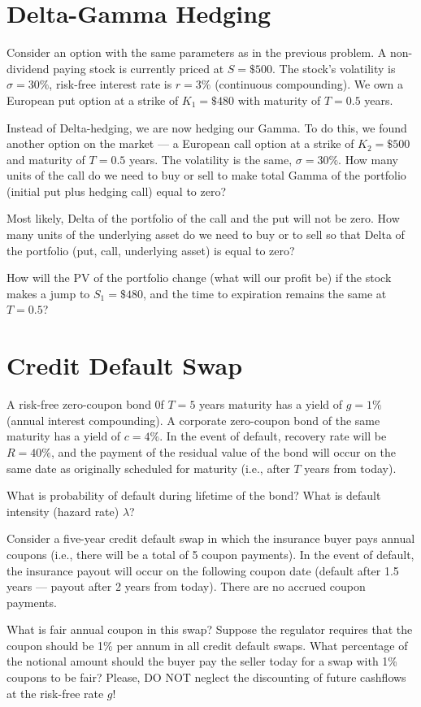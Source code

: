 \documentclass[a4paper,14pt]{extarticle}
\begin{document}
\section{Delta-Gamma Hedging}

Consider an option with the same parameters as in the previous problem. A non-dividend paying stock is currently priced at $S=\$500$. The stock's volatility is $\sigma=30\%$, risk-free interest rate is $r=3\%$ (continuous compounding). We own a European put option at a strike of $K_1=\$480$ with maturity of $T=0.5$ years.

Instead of Delta-hedging, we are now hedging our Gamma. To do this, we found another option on the market --- a European call option at a strike of $K_2=\$500$ and maturity of $T=0.5$ years. The volatility is the same, $\sigma=30\%$. How many units of the call do we need to buy or sell to make total Gamma of the portfolio (initial put plus hedging call) equal to zero?

Most likely, Delta of the portfolio of the call and the put will not be zero. How many units of the underlying asset do we need to buy or to sell so that Delta of the portfolio (put, call, underlying asset) is equal to zero?

How will the PV of the portfolio change (what will our profit be) if the stock makes a jump to $S_1=\$480$, and the time to expiration remains the same at $T=0.5$?

\section{Credit Default Swap}

A risk-free zero-coupon bond 0f $T=5$ years maturity has a yield of $g=1\%$ (annual interest compounding). A corporate zero-coupon bond of the same maturity has a yield of $c=4\%$. In the event of default, recovery rate will be $R=40\%$, and the payment of the residual value of the bond will occur on the same date as originally scheduled for maturity (i.e., after $T$ years from today).

What is probability of default during lifetime of the bond? What is default intensity (hazard rate) $\lambda$?

Consider a five-year credit default swap in which the insurance buyer pays annual coupons (i.e., there will be a total of 5 coupon payments). In the event of default, the insurance payout will occur on the following coupon date (default after 1.5 years --- payout after 2 years from today). There are no accrued coupon payments.

What is fair annual coupon in this swap? Suppose the regulator requires that the coupon should be 1\% per annum in all credit default swaps. What percentage of the notional amount should the buyer pay the seller today for a swap with 1\% coupons to be fair? Please, DO NOT neglect the discounting of future cashflows at the risk-free rate $g$!
\end{document}
